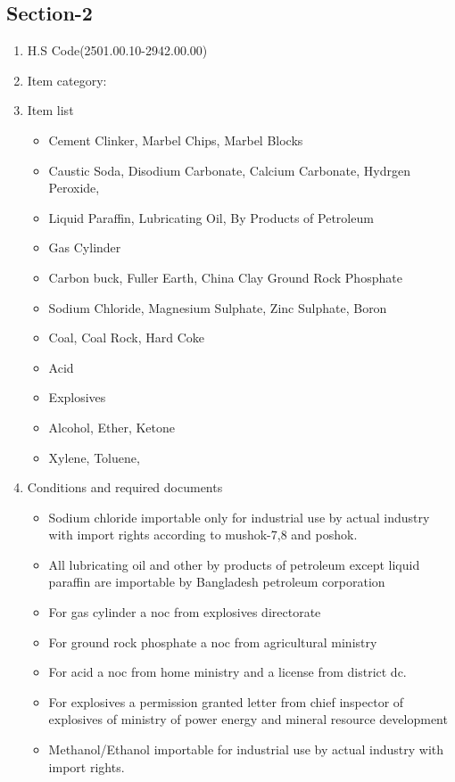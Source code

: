 \documentclass[10pt]{article}
\begin{document}
\subsection{Section-2}\label{sec-2}
\begin{enumerate}
    \item H.S Code(2501.00.10-2942.00.00)
    \item Item category: 
    \item Item list
\begin{itemize}
    \item Cement Clinker, Marbel Chips,
        Marbel Blocks
    \item Caustic Soda, Disodium Carbonate, Calcium
        Carbonate, Hydrgen Peroxide,
    \item Liquid Paraffin, Lubricating Oil,
        By Products of Petroleum
    \item Gas Cylinder
    \item Carbon buck, Fuller Earth, China Clay 
        Ground Rock Phosphate
    \item Sodium Chloride, Magnesium Sulphate,
        Zinc Sulphate, Boron
    \item Coal, Coal Rock, Hard Coke
    \item Acid
    \item Explosives
    \item Alcohol, Ether, Ketone
    \item Xylene, Toluene, 
\end{itemize}
    \item Conditions and required documents
\begin{itemize}
    \item Sodium chloride importable only for
    industrial use by actual industry with
    import rights according to
    mushok-7,8 and poshok.
    \item All lubricating oil and other
    by products of petroleum except liquid paraffin
    are importable by
    Bangladesh petroleum corporation
    \item For gas cylinder a noc from
    explosives directorate
    \item For ground rock phosphate a noc from
        agricultural ministry 
    \item For acid a noc from
        home ministry and a license from district dc.
    \item For explosives a permission granted
        letter from chief inspector of explosives of
        ministry of power energy and mineral resource
        development
    \item Methanol/Ethanol importable for
    industrial use by actual industry with
    import rights. 
\end{itemize}
\end{enumerate}
\end{document}
